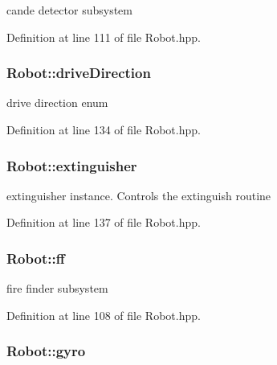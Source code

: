 cande detector subsystem 



Definition at line 111 of file Robot.\-hpp.

\hypertarget{classRobot_af15d2eaa46a9736e5d3d3aa9e8a9751c}{
\subsubsection[{drive\-Direction}]{ Robot\-::drive\-Direction\hspace{0.3cm}{\ttfamily [private]}}}\label{classRobot_af15d2eaa46a9736e5d3d3aa9e8a9751c}


drive direction enum 



Definition at line 134 of file Robot.\-hpp.

\hypertarget{classRobot_a506ec05fcf24208b486c48367b003e96}{
\subsubsection[{extinguisher}]{ Robot\-::extinguisher\hspace{0.3cm}{\ttfamily [private]}}}\label{classRobot_a506ec05fcf24208b486c48367b003e96}


extinguisher instance. Controls the extinguish routine 



Definition at line 137 of file Robot.\-hpp.

\hypertarget{classRobot_a342f5f8be2b5641eb3ae8f9c8475ebe6}{
\subsubsection[{ff}]{ Robot\-::ff}}\label{classRobot_a342f5f8be2b5641eb3ae8f9c8475ebe6}


fire finder subsystem 



Definition at line 108 of file Robot.\-hpp.

\hypertarget{classRobot_adafaf54e27eb3bd0cf08e32d7206e6a8}{
\subsubsection[{gyro}]{ Robot\-::gyro\hspace{0.3cm}{\ttfamily [private]}}}\label{classRobot_adafaf54e27eb3bd0cf08e32d7206e6a8}


